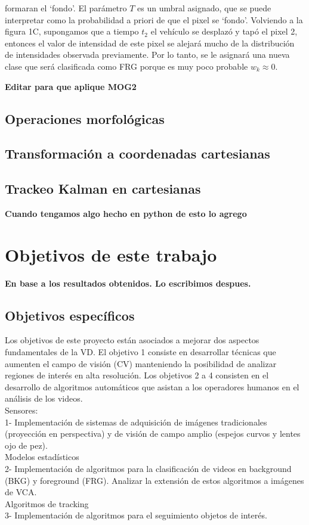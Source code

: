 \documentclass[12pt,a4paper]{article}
\begin{document}
formaran el ‘fondo’. El parámetro $T$ es un umbral asignado, que se puede interpretar como la probabilidad a priori de que el pixel se ‘fondo’.
Volviendo a la figura 1C, supongamos que a tiempo $t_2$ el vehículo se desplazó y tapó el pixel 2, entonces el valor de intensidad de este pixel se alejará mucho de la distribución de intensidades observada previamente. Por lo tanto, se le asignará una nueva clase que será clasificada como FRG porque es muy poco probable $w_k \approx 0$.

\textbf{Editar para que aplique MOG2}

\subsection{Operaciones morfológicas}

\subsection{Transformación a coordenadas cartesianas}

\subsection{Trackeo Kalman en cartesianas}

\textbf{Cuando tengamos algo hecho en python de esto lo agrego}

\section{Objetivos de este trabajo}

\textbf{En base a los resultados obtenidos. Lo escribimos despues.}

\subsection{Objetivos específicos}

Los objetivos de este proyecto están asociados a mejorar dos aspectos fundamentales de la VD. El objetivo 1 consiste en desarrollar técnicas que aumenten el campo de visión (CV) manteniendo la posibilidad de analizar regiones de interés en alta resolución. Los objetivos 2 a 4 consisten en el desarrollo de algoritmos automáticos que asistan a los operadores humanos en el análisis de los videos.
\\
Sensores:
\\1- Implementación de sistemas de adquisición de imágenes tradicionales (proyección en perspectiva) y de visión de campo amplio (espejos curvos y lentes ojo de pez). 
\\Modelos estadísticos
\\2- Implementación de algoritmos para la clasificación de videos en background (BKG) y foreground (FRG). Analizar la extensión de estos algoritmos a imágenes de VCA.
\\Algoritmos de tracking
\\3- Implementación de algoritmos para el seguimiento objetos de interés.
\end{document}
